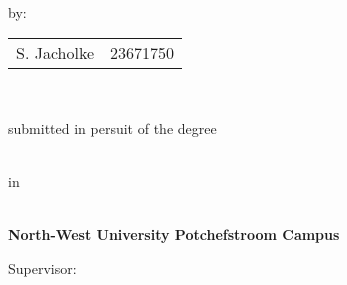 

\thispagestyle{empty}
\begin{titlepage}
\thispagestyle{empty}


\begin{center}
\large

\hfill
\vfill

\begingroup
\color{Maroon}\Large{} \\ \bigskip %
\endgroup
\vspace{5mm}
by: \\
 \begin{tabular}{l  r} 
 S. Jacholke & 23671750 \\

 \end{tabular}			\\
 
\vfill

submitted in persuit of the degree\\
\vspace{8mm}

\\

in\\

\\

\vfill

\textbf{North-West University  Potchefstroom Campus}\\

			
\vspace*{0.8cm}

\begin{flushleft}
Supervisor: \mySupervisor

\myLocation

\myTime

\myVersion

\end{flushleft}



\vfill

\end{center}

\end{titlepage}






